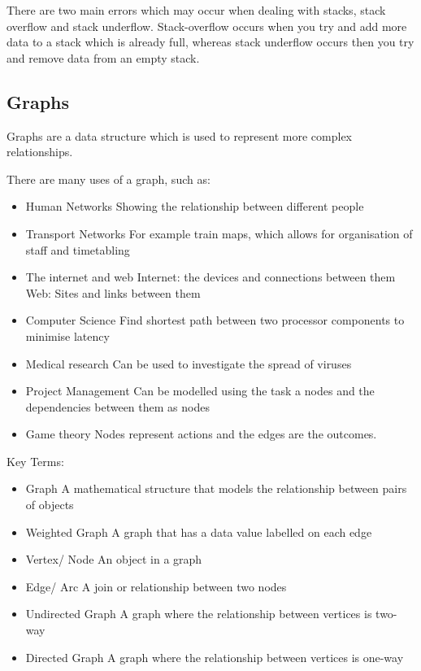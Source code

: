   There are two main errors which may occur when dealing with stacks, stack overflow and stack underflow. Stack-overflow occurs when you try and add more data to a stack which is already full, whereas stack underflow occurs then you try and remove data from an empty stack.
  
\subsection{Graphs}
  
  Graphs are a data structure which is used to represent more complex relationships.
  
  There are many uses of a graph, such as:
  \begin{itemize}
  	\item Human Networks
	  	\subitem Showing the relationship between different people
  	\item Transport Networks
	  	\subitem For example train maps, which allows for organisation of staff and timetabling
  	\item The internet and web
	  	\subitem Internet: the devices and connections between them
	  	\subitem Web: Sites and links between them
  	\item Computer Science
	  	\subitem Find shortest path between two processor components to minimise latency
  	\item Medical research
	  	\subitem Can be used to investigate the spread of viruses
  	\item Project Management
	  	\subitem Can be modelled using the task a nodes and the dependencies between them as nodes
  	\item Game theory
	  	\subitem Nodes represent actions and the edges are the outcomes.
  \end{itemize}
  
  Key Terms:
  \begin{itemize}
  	\item Graph
	  	\subitem A mathematical structure that models the relationship between pairs of objects
  	\item Weighted Graph
	  	\subitem A graph that has a data value labelled on each edge
  	\item Vertex/ Node
	  	\subitem An object in a graph
  	\item Edge/ Arc
	  	\subitem A join or relationship between two nodes
  	\item Undirected Graph
	  	\subitem A graph where the relationship between vertices is two-way
  	\item Directed Graph
	  	\subitem A graph where the relationship between vertices is one-way
  \end{itemize}
  
